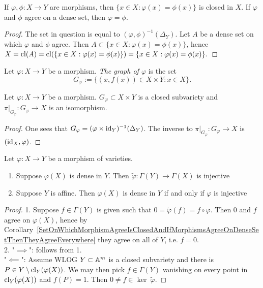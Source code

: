         \begin{corollary}\label{SetOnWhichMorphismAgreeIsClosedAndIfMorphismsAgreeOnDenseSetThenTheyAgreeEverywhere}
            If $\varphi,\phi: X\rightarrow Y $ are morphisms, then $\{ x\in X: \varphi(x)=\phi(x)\}$ is closed in $X$. If $\varphi$ and $\phi$ agree on a dense set, then $\varphi=\phi$.
        \end{corollary}
        \begin{proof}
            The set in question is equal to $(\varphi,\phi)^{-1}(\Delta_Y)$. Let $A$ be a dense set on which $\varphi$ and $\phi$ agree. Then $A\subset \{x\in X: \varphi(x)=\phi(x)\}$, hence $X=\mathrm{cl}(A)=\mathrm{cl}(\{x\in X: \varphi(x)=\phi(x)\})=\{x\in X: \varphi(x)=\phi(x)\}.$
        \end{proof}
        \begin{definition}
            Let $\varphi: X\rightarrow Y$ be a morphism. \textit{The graph of $\varphi$} is the set 
            $$G_\varphi :=\{(x,f(x))\in X\times Y: x\in X\}.$$
        \end{definition}
        \begin{proposition}\label{GraphIsAClosedSubvariety}
            Let $\varphi : X\rightarrow Y$ be a morphism. $G_\varphi\subset X\times Y$ is a closed subvariety and $\left.\pi\right|_{G_\varphi}: G_\varphi\rightarrow X$ is an isomorphism. 
        \end{proposition}
        \begin{proof}
            One sees that $G_\varphi = (\varphi\times \mathrm{id}_Y)^{-1}(\Delta_Y)$. The inverse to $\left.\pi\right|_{G_\varphi}: G_\varphi\rightarrow X$ is $(\mathrm{id}_X,\varphi)$.
        \end{proof}
        \begin{lemma}\label{ImageDenseIffInducedMapInjective}
            Let $\varphi:X\rightarrow Y$ be a morphism of varieties. 
            \begin{enumerate}
                \item Suppose $\varphi(X)$ is dense in $Y$. Then $\widetilde{\varphi}: \Gamma(Y)\rightarrow\Gamma(X)$ is injective
                \item Suppose $Y$ is affine. Then $\varphi(X)$ is dense in $Y$ if and only if $\varphi$ is injective
            \end{enumerate}
        \end{lemma}
        \begin{proof}
            1. Suppose $f\in \Gamma(Y)$ is given such that $0=\widetilde{\varphi}(f)= f\circ\varphi$. Then $0$ and $f$ agree on $\varphi(X)$, hence by Corollary~\ref{SetOnWhichMorphismAgreeIsClosedAndIfMorphismsAgreeOnDenseSetThenTheyAgreeEverywhere} they agree on all of $Y$, i.e. $f=0$.\\
            2. "$\implies$": follows from 1.\\
            "$\impliedby$": Assume WLOG $Y\subset \mathbb{A}^m$ is a closed subvariety and there is $P\in Y\setminus \mathrm{cl}_Y(\varphi(X))$. We may then pick $f\in \Gamma(Y)$ vanishing on every point in $\mathrm{cl}_Y(\varphi(X))$ and $f(P)=1$. Then $0\neq f\in \ker \ \widetilde{\varphi}$.
        \end{proof}
